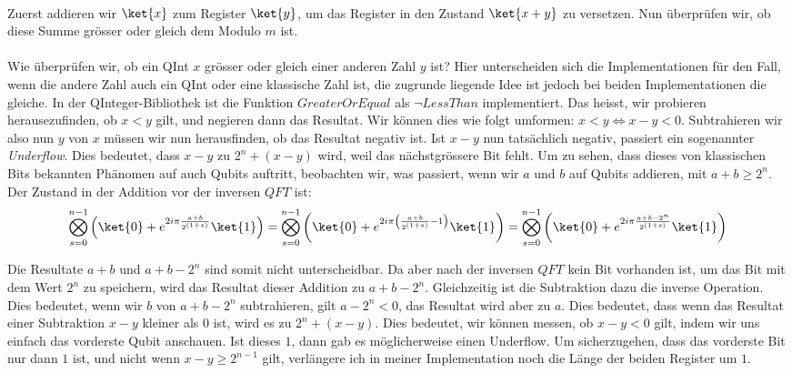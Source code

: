 \paragraph{}

Zuerst addieren wir $\ket{x}$ zum Register $\ket{y}$, um das Register in den Zustand $\ket{x + y}$ zu versetzen. Nun überprüfen wir, ob diese Summe grösser oder gleich dem Modulo $m$ ist. 

\paragraph{}

Wie überprüfen wir, ob ein QInt $x$ grösser oder gleich einer anderen Zahl $y$ ist? Hier unterscheiden sich die Implementationen für den Fall, wenn die andere Zahl auch ein QInt oder eine klassische Zahl ist, die zugrunde liegende Idee ist jedoch bei beiden Implementationen die gleiche. In der QInteger-Bibliothek ist die Funktion $GreaterOrEqual$ als $\neg LessThan$ implementiert. Das heisst, wir probieren herausezufinden, ob $x < y$ gilt, und negieren dann das Resultat. Wir können dies wie folgt umformen: $x < y \Leftrightarrow x - y < 0$. Subtrahieren wir also nun $y$ von $x$ müssen wir nun herausfinden, ob das Resultat negativ ist. Ist $x - y$ nun tatsächlich negativ, passiert ein sogenannter \textit{Underflow}. Dies bedeutet, dass $x - y$ zu $2^n + (x - y)$ wird, weil das nächstgrössere Bit fehlt. Um zu sehen, dass dieses von klassischen Bits bekannten Phänomen auf auch Qubits auftritt, beobachten wir, was passiert, wenn wir $a$ und $b$ auf Qubits addieren, mit $a + b \geq 2^n$. Der Zustand in der Addition vor der inversen $QFT$ ist: $$\bigotimes_{s = 0}^{n - 1}{\left( \ket{0} + e^{2i\pi\frac{a + b}{2^{(1 + s)}}}\ket{1} \right)} = \bigotimes_{s = 0}^{n - 1}{\left(\ket{0} + e^{2i\pi\left(\frac{a + b}{2^{(1 + s)}} - 1\right)}\ket{1} \right)} = \bigotimes_{s = 0}^{n - 1}{\left( \ket{0} + e^{2i\pi\frac{a + b - 2^n}{2^{(1 + s)}}}\ket{1} \right)}$$

Die Resultate $a + b$ und $a + b - 2^n$ sind somit nicht unterscheidbar. Da aber nach der inversen $QFT$ kein Bit vorhanden ist, um das Bit mit dem Wert $2^n$ zu speichern, wird das Resultat dieser Addition zu $a + b - 2^n$. Gleichzeitig ist die Subtraktion dazu die inverse Operation. Dies bedeutet, wenn wir $b$ von $a + b - 2^n$ subtrahieren, gilt $a - 2^n < 0$, das Resultat wird aber zu $a$. Dies bedeutet, dass wenn das Resultat einer Subtraktion $x - y$ kleiner als $0$ ist, wird es zu $2^n + (x - y)$. Dies bedeutet, wir können messen, ob $x - y < 0$ gilt, indem wir uns einfach das vorderste Qubit anschauen. Ist dieses $1$, dann gab es möglicherweise einen Underflow. Um sicherzugehen, dass das vorderste Bit nur dann $1$ ist, und nicht wenn $x - y \geq 2^{n - 1}$ gilt, verlängere ich in meiner Implementation noch die Länge der beiden Register um $1$. 

